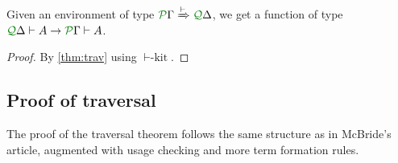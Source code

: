 \documentclass[submission,copyright,creativecommons]{eptcs}
\begin{document}
\begin{corollary}\label{cor:sub}
  Given an environment of type $\ctx{\Gamma}{P} \subst{\vdash} \ctx{\Delta}{Q}$,
  we get a function of type
  $\ctx{\Delta}{Q} \vdash A \to \ctx{\Gamma}{P} \vdash A$.
\end{corollary}
\begin{proof}
  By \autoref{thm:trav} using \hyperref[tm-kit]{$\vdash\textrm{-kit}$}.
\end{proof}

\subsection{Proof of traversal}
\label{sec:proof-of-traversal}

The proof of the traversal theorem follows the same structure as in McBride's
article, augmented with usage checking and more term formation rules.
\end{document}
